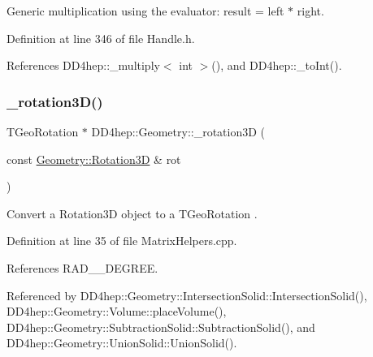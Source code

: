 Generic multiplication using the evaluator\+: result = left $\ast$ right. 



Definition at line 346 of file Handle.\+h.



References D\+D4hep\+::\+\_\+multiply$<$ int $>$(), and D\+D4hep\+::\+\_\+to\+Int().

\hypertarget{group___d_d4_h_e_p___g_e_o_m_e_t_r_y_ga1dc4cc8b92d11d2fc874ed142c7b1bbc}{}\label{group___d_d4_h_e_p___g_e_o_m_e_t_r_y_ga1dc4cc8b92d11d2fc874ed142c7b1bbc} 
\subsubsection{\texorpdfstring{\+\_\+rotation3\+D()}{\_rotation3D()}}
{\footnotesize\ttfamily T\+Geo\+Rotation $\ast$ D\+D4hep\+::\+Geometry\+::\+\_\+rotation3D (\begin{DoxyParamCaption}\item[{const \hyperlink{namespace_d_d4hep_1_1_geometry_a022fecb763315fa2bf39cbb648944a0e}{Geometry\+::\+Rotation3D} \&}]{rot }\end{DoxyParamCaption})}



Convert a Rotation3D object to a T\+Geo\+Rotation . 



Definition at line 35 of file Matrix\+Helpers.\+cpp.



References R\+A\+D\+\_\+\_\+\+D\+E\+G\+R\+EE.



Referenced by D\+D4hep\+::\+Geometry\+::\+Intersection\+Solid\+::\+Intersection\+Solid(), D\+D4hep\+::\+Geometry\+::\+Volume\+::place\+Volume(), D\+D4hep\+::\+Geometry\+::\+Subtraction\+Solid\+::\+Subtraction\+Solid(), and D\+D4hep\+::\+Geometry\+::\+Union\+Solid\+::\+Union\+Solid().

\hypertarget{group___d_d4_h_e_p___g_e_o_m_e_t_r_y_gac468c0a81631e0a1c052094131f9d680}{}\label{group___d_d4_h_e_p___g_e_o_m_e_t_r_y_gac468c0a81631e0a1c052094131f9d680} 
